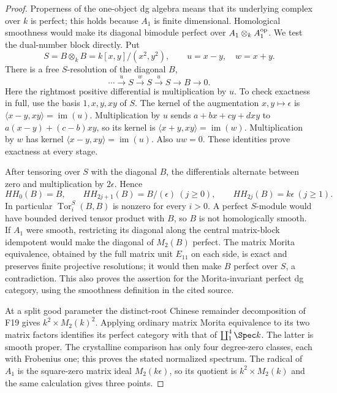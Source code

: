 \documentclass[11pt,a4paper]{article}
\renewcommand{\S}{\ensuremath{\mathsection}}
\newcommand{\fid}[1]{\textsf{#1}}\newcommand{\gate}[1]{\textsf{#1}}
\theoremstyle{named}\newtheorem{finding}{Finding}[section]
\theoremstyle{definition}\newtheorem{definition}[finding]{Definition}
\theoremstyle{remark}\newtheorem{remark}[finding]{Remark}
\begin{document}
\begin{proof}
Properness of the one-object dg algebra means that its underlying
complex over $k$ is perfect; this holds because $A_1$ is finite
dimensional. Homological smoothness would make its diagonal bimodule
perfect over $A_1\otimes_k A_1^{\rm op}$.
We test the dual-number block directly.
Put
\[
 S=B\otimes_k B=k[x,y]/(x^2,y^2),\qquad
 u=x-y,\quad w=x+y.
\]
There is a free $S$-resolution of the diagonal $B$,
\[
 \cdots\xrightarrow{u}S\xrightarrow{w}S
       \xrightarrow{u}S\longrightarrow B\longrightarrow0.
\]
Here the rightmost positive differential is multiplication by $u$.
To check exactness in full, use the basis $1,x,y,xy$ of $S$.
The kernel of the augmentation $x,y\mapsto\epsilon$ is
$\langle x-y,xy\rangle=\operatorname{im}(u)$.
Multiplication by $u$ sends
$a+bx+cy+dxy$ to $a(x-y)+(c-b)xy$, so its kernel is
$\langle x+y,xy\rangle=\operatorname{im}(w)$.
Multiplication by $w$ has kernel
$\langle x-y,xy\rangle=\operatorname{im}(u)$.
Also $uw=0$. These identities prove exactness at every stage.

After tensoring over $S$ with the diagonal $B$, the differentials
alternate between zero and multiplication by $2\epsilon$. Hence
\[
 HH_0(B)=B,\qquad
 HH_{2j+1}(B)=B/(\epsilon)\ (j\ge0),\qquad
 HH_{2j}(B)=k\epsilon\ (j\ge1).
\]
In particular $\operatorname{Tor}^{S}_i(B,B)$ is nonzero for
every $i>0$. A perfect $S$-module would have bounded derived tensor
product with $B$, so $B$ is not homologically smooth.
If $A_1$ were smooth, restricting its diagonal along the central
matrix-block idempotent would make the diagonal of $M_2(B)$
perfect. The matrix Morita equivalence, obtained by the full matrix
unit $E_{11}$ on each side, is exact and preserves finite projective
resolutions; it would then make $B$ perfect over $S$, a contradiction.
This also proves the assertion for the Morita-invariant perfect dg
category, using the smoothness definition in the cited source.

At a split good parameter the distinct-root Chinese remainder
decomposition of \fid{F19} gives $k^2\times M_2(k)^2$.
Applying ordinary matrix Morita equivalence to its two matrix factors
identifies its perfect category with that of $\coprod_1^4\Spec k$.
The latter is smooth proper. The crystalline comparison
\cite[\S7, equations~(7.1)--(7.4), p.~17]{TabuadaWeil}
has only four degree-zero classes, each with Frobenius one; this
proves the stated normalized spectrum. The radical of $A_1$ is
the square-zero matrix ideal $M_2(k\epsilon)$, so its quotient is
$k^2\times M_2(k)$ and the same calculation gives three points.
\end{proof}
\end{document}

